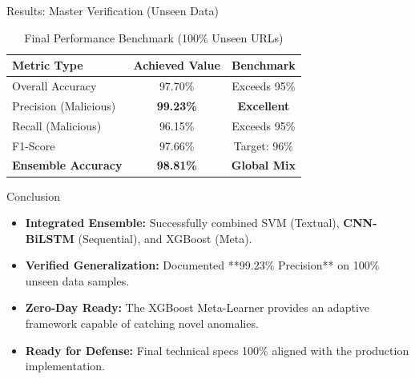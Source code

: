 \documentclass[aspectratio=169,xcolor=dvipsnames]{beamer}
\begin{document}
\begin{frame}{Results: Master Verification (Unseen Data)}
\begin{table}[htbp]
\centering
\caption{Final Performance Benchmark (100\% Unseen URLs)}
\renewcommand{\arraystretch}{1.1}
\begin{tabular}{|l|c|c|}
\hline
\textbf{Metric Type} & \textbf{Achieved Value} & \textbf{Benchmark} \\
\hline
Overall Accuracy & 97.70\% & Exceeds 95\% \\
\hline
Precision (Malicious) & \textbf{99.23\%} & \textbf{Excellent} \\
\hline
Recall (Malicious) & 96.15\% & Exceeds 95\% \\
\hline
F1-Score & 97.66\% & Target: 96\% \\
\hline
\textbf{Ensemble Accuracy} & \textbf{98.81\%} & \textbf{Global Mix} \\
\hline
\end{tabular}
\end{table}
\end{frame}

\begin{frame}{Conclusion}
\begin{itemize}
    \item \textbf{Integrated Ensemble:} Successfully combined SVM (Textual), \textbf{CNN-BiLSTM} (Sequential), and XGBoost (Meta).
    \item \textbf{Verified Generalization:} Documented **99.23\% Precision** on 100\% unseen data samples.
    \item \textbf{Zero-Day Ready:} The XGBoost Meta-Learner provides an adaptive framework capable of catching novel anomalies.
    \item \textbf{Ready for Defense:} Final technical specs 100\% aligned with the production implementation.
\end{itemize}
\end{frame}
\end{document}
